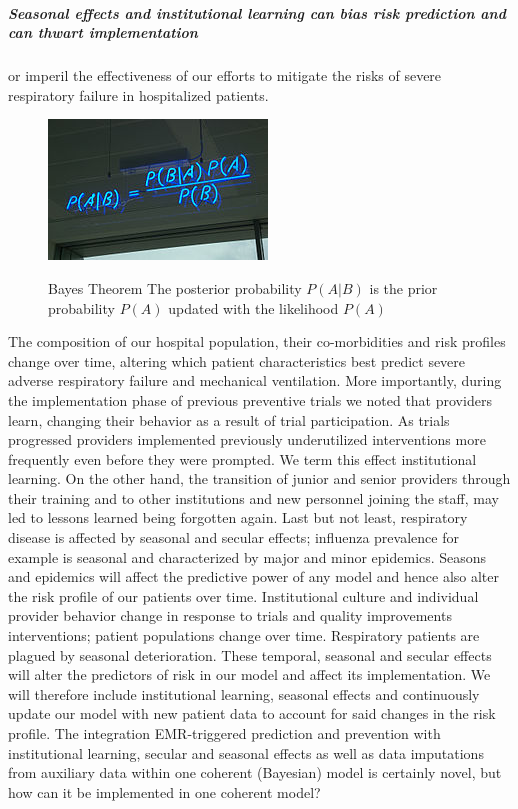 \documentclass[11pt,notitlepage]{article}
\begin{document}
\subparagraph*{Seasonal effects and institutional learning can bias risk prediction and can thwart implementation} or imperil the effectiveness of our efforts to mitigate the risks of severe respiratory failure in hospitalized patients. 
\begin{figure} %
 \vspace{-10pt}
 \href{http://en.wikipedia.org/wiki/Bayes'_theorem}{ \includegraphics[scale=0.6]{Figures/BayesTheorem.jpg}}
  \vspace{-20pt}
 \caption{\footnotesize Bayes Theorem \cite{Thomas_Bayes} The posterior probability $P(A|B)$ is the prior probability $P(A)$ updated with the  likelihood $P(A)$}
 \vspace{-15pt}
 \label{fig:BayesTheorem}
\end{figure} The composition of our hospital population, their co-morbidities and risk profiles change over time, altering which patient characteristics best predict severe adverse respiratory failure and mechanical ventilation. More importantly,  during the implementation phase of previous preventive trials we noted that providers learn, changing their behavior as a result of trial participation. As trials progressed providers implemented previously underutilized interventions more frequently even before they were prompted. We term this effect institutional learning. On the other hand, the transition of junior and senior providers through their training and to other institutions and new personnel joining the staff, may led to lessons learned being forgotten again. Last but not least, respiratory disease is affected by seasonal and secular effects; influenza prevalence for example is seasonal and characterized by major and minor epidemics. Seasons and epidemics will affect the predictive power of any model and hence also alter the risk profile of our patients over time. Institutional culture and individual provider behavior change in response to trials and quality improvements interventions; patient populations change over time. Respiratory patients are plagued by seasonal deterioration. These temporal, seasonal and secular effects will alter the predictors of risk in our model and affect its implementation. We will therefore include institutional learning, seasonal effects and continuously update our model with new patient data to account for said changes in the risk profile. The integration EMR-triggered prediction and prevention with  institutional learning, secular and seasonal effects as well as data imputations from auxiliary data within one coherent (Bayesian) model is certainly novel, but how can it be implemented in one coherent model? 
\end{document}
